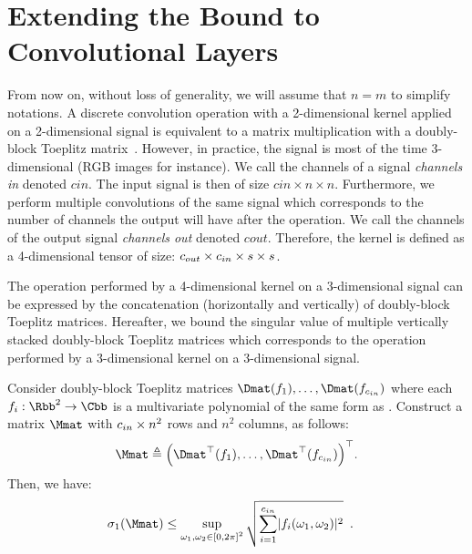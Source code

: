 \section{Extending the Bound to Convolutional Layers}
\label{section:ch5-bound_on_the_singular_values_of_convolutional_layers}

From now on, without loss of generality, we will assume that $n=m$ to simplify notations.
A discrete convolution operation with a 2-dimensional kernel applied on a 2-dimensional signal is equivalent to a matrix multiplication with a doubly-block Toeplitz matrix~\cite{jain1989fundamentals}.
However, in practice, the signal is most of the time 3-dimensional (RGB images for instance).
We call the channels of a signal \emph{channels in} denoted $cin$.
The input signal is then of size $cin \times n \times n$.
Furthermore, we perform multiple convolutions of the same signal which corresponds to the number of channels the output will have after the operation.
We call the channels of the output signal \emph{channels out} denoted $cout$.
Therefore, the kernel is defined as a 4-dimensional tensor of size: $c_{out} \times c_{in} \times s \times s$. 

The operation performed by a 4-dimensional kernel on a 3-dimensional signal can be expressed by the concatenation (horizontally and vertically) of doubly-block Toeplitz matrices.
Hereafter, we bound the singular value of multiple vertically stacked doubly-block Toeplitz matrices which corresponds to the operation performed by a 3-dimensional kernel on a 3-dimensional signal.

\begin{theorem} \label{theorem:bound_sv_stacked_dbt} 
  Consider doubly-block Toeplitz matrices $\Dmat(f_1), \dots, \Dmat(f_{\cin})$ where each $f_i: \Rbb^2 \rightarrow \Cbb$ is a multivariate polynomial of the same form as .
  Construct a matrix $\Mmat$ with $c_{in}\times n^2$ rows and $n^2$ columns, as follows:
  \begin{equation}
    \Mmat \triangleq \leftmat \Dmat^\top(f_1), \dots, \Dmat^\top(f_{\cin}) \rightmat^\top .
  \end{equation}
  Then, we have:
  \begin{align} \label{equation:bound_asymptotic_equiv}
    \sigma_1 \left( \Mmat \right) &\leq \sup_{\omega_1, \omega_2 \in \left[0, 2\pi\right]^2} \sqrt{ \sum_{i=1}^{\cin} \left|f_i\right (\omega_1, \omega_2)|^2} \enspace.
  \end{align}
\end{theorem}

